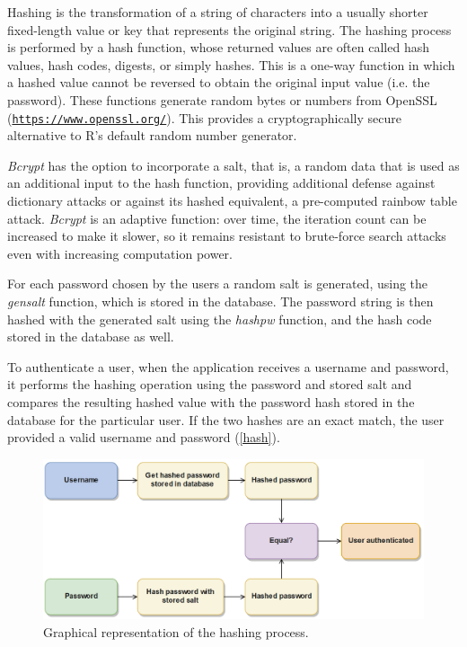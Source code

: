 Hashing is the transformation of a string of characters into a usually shorter fixed-length value or key that represents the original string. The hashing process is performed by a hash function, whose returned values are often called hash values, hash codes, digests, or simply hashes. This is a one-way function in which a hashed value cannot be reversed to obtain the original input value (i.e. the password). These functions generate random bytes or numbers from OpenSSL (\href{https://www.openssl.org/}{\nolinkurl{https://www.openssl.org/}}). This provides a cryptographically secure alternative to R's default random number generator. 

\textit{Bcrypt} has the option to incorporate a salt, that is, a random data that is used as an additional input to the hash function, providing additional defense against dictionary attacks or against its hashed equivalent, a pre-computed rainbow table attack. \textit{Bcrypt} is an adaptive function: over time, the iteration count can be increased to make it slower, so it remains resistant to brute-force search attacks even with increasing computation power.

For each password chosen by the users a random salt is generated, using the \textit{gensalt} function, which is stored in the database. The password string is then hashed with the generated salt using the \textit{hashpw} function, and the hash code stored in the database as well. 

To authenticate a user, when the application receives a username and password, it performs the hashing operation using the password and stored salt and compares the resulting hashed value with the password hash stored in the database for the particular user. If the two hashes are an exact match, the user provided a valid username and password (\autoref{hash}).

\begin{figure}[h]
	\centering
	\includegraphics[width=0.85\linewidth]{Imagens/hash}
	\caption{Graphical representation of the hashing process.}
	\label{hash}
\end{figure}


